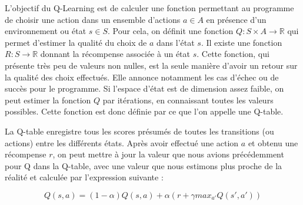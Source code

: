 \documentclass[
    10pt,
    a4paper,
    oneside,
    headinclude,footinclude,
    BCOR=5mm,
    captions=tableabove
]{scrartcl}
\begin{document}
L'objectif du Q-Learning est de calculer une fonction permettant au programme de choisir une action dans un ensemble d'actions $a \in A$ en présence d'un environnement ou état $s \in S$. Pour cela, on définit une fonction $Q: S \times A \rightarrow \mathbb{R}$ qui permet d'estimer la qualité du choix de $a$ dans l'état $s$. Il existe une fonction $R: S \rightarrow \mathbb{R}$ donnant la récompense associée à un état $s$. Cette fonction, qui présente très peu de valeurs non nulles, est la seule manière d'avoir un retour sur la qualité des choix effectués. Elle annonce notamment les cas d'échec ou de succès pour le programme. Si l'espace d'état est de dimension assez faible, on peut estimer la fonction $Q$ par itérations, en connaissant toutes les valeurs possibles. Cette fonction est donc définie par ce que l'on appelle une Q-table.

La Q-table enregistre tous les scores présumés de toutes les transitions (ou actions) entre les différents états. Après avoir effectué une action $a$ et obtenu une récompense $r$, on peut mettre à jour la valeur que nous avions précédemment pour Q dans la Q-table, avec une valeur que nous estimons plus proche de la réalité et calculée par l'expression suivante :

$$Q(s,a) = (1-\alpha) Q(s,a) + \alpha (r + \gamma max_{a'} Q(s',a') )$$
\end{document}
